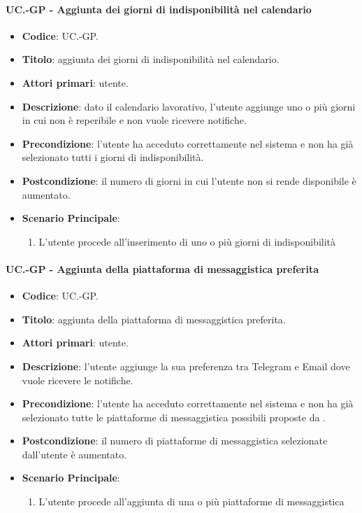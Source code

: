 	\paragraph{UC\theuccount.\thesubuccount-GP - Aggiunta dei giorni di indisponibilità nel calendario}
		
		\begin{itemize}
			\item \textbf{Codice}: UC\theuccount.\thesubuccount-GP.
			\item \textbf{Titolo}: aggiunta dei giorni di indisponibilità nel calendario.
			\item \textbf{Attori primari}: utente.
			\item \textbf{Descrizione}: dato il calendario lavorativo, l’utente aggiunge uno o più giorni in cui non è reperibile e non vuole ricevere notifiche.
			\item \textbf{Precondizione}: l’utente ha acceduto correttamente nel sistema e non ha già selezionato tutti i giorni di indisponibilità.
			\item \textbf{Postcondizione}: il numero di giorni in cui l’utente non si rende disponibile è aumentato.
			\item \textbf{Scenario Principale}:
			\begin{enumerate}
				\item L'utente procede all'inserimento di uno o più giorni di indisponibilità
			\end{enumerate}
		\end{itemize}
	
	\paragraph{UC\theuccount.\thesubuccount-GP - Aggiunta della piattaforma di messaggistica preferita}
		
		\begin{itemize}
			\item \textbf{Codice}: UC\theuccount.\thesubuccount-GP.
			\item \textbf{Titolo}: aggiunta della piattaforma di messaggistica preferita.
			\item \textbf{Attori primari}: utente.
			\item \textbf{Descrizione}: l’utente aggiunge la sua preferenza tra Telegram e Email dove vuole ricevere le notifiche.
			\item \textbf{Precondizione}: l’utente ha acceduto correttamente nel sistema e non ha già selezionato tutte le piattaforme di messaggistica possibili proposte da \progetto.
			\item \textbf{Postcondizione}: il numero di piattaforme di messaggistica selezionate dall’utente è aumentato.
			\item \textbf{Scenario Principale}:
			\begin{enumerate}
				\item L'utente procede all'aggiunta di una o più piattaforme di messaggistica
			\end{enumerate}
		\end{itemize}
	
